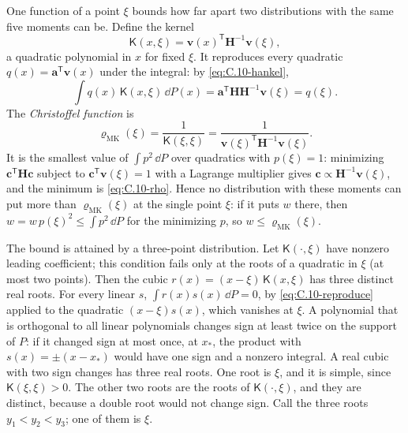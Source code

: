 One function of a point $\xi$ bounds how far apart two distributions with the same five moments can be. Define the kernel
\begin{equation}
  \mathsf{K}(x,\xi) = \mathbf{v}(x)^{\mathsf{T}}\mathbf{H}^{-1}\mathbf{v}(\xi) ,
  \label{eq:C.10-kernel}
\end{equation}
a quadratic polynomial in $x$ for fixed $\xi$. It reproduces every quadratic $q(x) = \mathbf{a}^{\mathsf{T}}\mathbf{v}(x)$ under the integral: by \cref{eq:C.10-hankel},
\begin{equation}
  \int q(x)\,\mathsf{K}(x,\xi)\,\dd P(x) = \mathbf{a}^{\mathsf{T}}\mathbf{H}\mathbf{H}^{-1}\mathbf{v}(\xi) = q(\xi) .
  \label{eq:C.10-reproduce}
\end{equation}
The \emph{Christoffel function} is
\begin{equation}
  \varrho_{\mathrm{MK}}(\xi) = \frac{1}{\mathsf{K}(\xi,\xi)} = \frac{1}{\mathbf{v}(\xi)^{\mathsf{T}}\mathbf{H}^{-1}\mathbf{v}(\xi)} .
  \label{eq:C.10-rho}
\end{equation}
It is the smallest value of $\int p^2\,\dd P$ over quadratics with $p(\xi) = 1$: minimizing $\mathbf{c}^{\mathsf{T}}\mathbf{H}\mathbf{c}$ subject to $\mathbf{c}^{\mathsf{T}}\mathbf{v}(\xi) = 1$ with a Lagrange multiplier gives $\mathbf{c} \propto \mathbf{H}^{-1}\mathbf{v}(\xi)$, and the minimum is \cref{eq:C.10-rho}. Hence no distribution with these moments can put more than $\varrho_{\mathrm{MK}}(\xi)$ at the single point $\xi$: if it puts $w$ there, then $w = w\,p(\xi)^2 \le \int p^2\,\dd P$ for the minimizing $p$, so $w \le \varrho_{\mathrm{MK}}(\xi)$.

The bound is attained by a three-point distribution. Let $\mathsf{K}(\cdot,\xi)$ have nonzero leading coefficient; this condition fails only at the roots of a quadratic in $\xi$ (at most two points). Then the cubic $r(x) = (x - \xi)\,\mathsf{K}(x,\xi)$ has three distinct real roots. For every linear $s$, $\int r(x)s(x)\,\dd P = 0$, by \cref{eq:C.10-reproduce} applied to the quadratic $(x - \xi)s(x)$, which vanishes at $\xi$. A polynomial that is orthogonal to all linear polynomials changes sign at least twice on the support of $P$: if it changed sign at most once, at $x_*$, the product with $s(x) = \pm(x - x_*)$ would have one sign and a nonzero integral. A real cubic with two sign changes has three real roots. One root is $\xi$, and it is simple, since $\mathsf{K}(\xi,\xi) > 0$. The other two roots are the roots of $\mathsf{K}(\cdot,\xi)$, and they are distinct, because a double root would not change sign. Call the three roots $y_1 < y_2 < y_3$; one of them is $\xi$.

